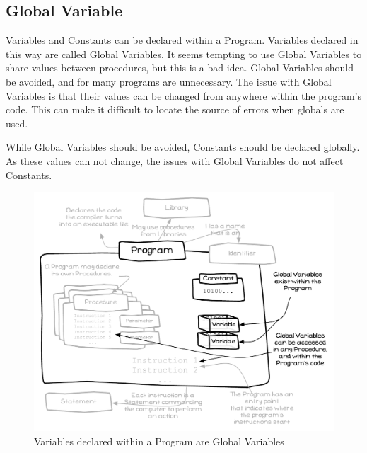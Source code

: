 \clearpage
\subsection{Global Variable} %
\label{sub:global_variable}

Variables and Constants can be declared within a Program. Variables declared in this way are called Global Variables. It seems tempting to use Global Variables to share values between procedures, but this is a bad idea. Global Variables should be avoided, and for many programs are unnecessary. The issue with Global Variables is that their values can be changed from anywhere within the program's code. This can make it difficult to locate the source of errors when globals are used.

While Global Variables should be avoided, Constants should be declared globally. As these values can not change, the issues with Global Variables do not affect Constants. 

\begin{figure}[h]
   \centering
   \includegraphics[width=\textwidth]{./topics/storing-using-data/diagrams/GlobalVariables} 
   \caption{Variables declared within a Program are Global Variables}
   \label{fig:storing-using-data-global-variables}
\end{figure}

